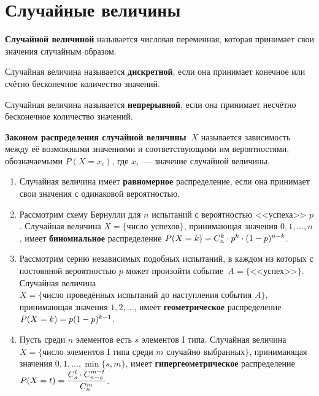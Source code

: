 \section{Случайные величины}
 \textbf{Случайной величиной} называется числовая переменная, которая принимает свои значения случайным образом.

Случайная величина называется \textbf{дискретной}, если она принимает конечное или счётно бесконечное количество значений.

Случайная величина называется \textbf{непрерывной}, если она принимает несчётно бесконечное количество значений.

 \textbf{Законом распределения случайной величины~$X$} называется зависимость между её возможными значениями и соответствующими им вероятностями, обозначаемыми $P(X = x_i)$, где $x_i$~--- значение случайной величины.
\begin{enumerate}
	\item Случайная величина имеет \textbf{равномерное} распределение, если она принимает свои значения с одинаковой вероятностью.
	
	\item Рассмотрим схему Бернулли для $n$ испытаний с вероятностью <<успеха>> $p$.
	Случайная величина $X = \{ \text{число } \allowbreak \text{успехов} \}$, принимающая значения $0, 1, \ldots, n$, имеет \textbf{биномиальное} распределение $P(X = k) = C_n^k \opbr\cdot p^k \opbr\cdot (1 \opbr- p)^{n-k}$.
	
	\item Рассмотрим серию независимых подобных испытаний, в каждом из которых с постоянной вероятностью $p$ может произойти событие~$A = \{ \text{<<успех>>} \}$.
	Случайная величина $X = \{ \text{число проведённых испытаний до } \allowbreak \text{наступления события } A \}$, принимающая значения $1, 2, \ldots$, имеет \textbf{геометрическое} распределение $P(X = k) \opbr= p (1 - p)^{k-1}$.
	
	\item Пусть среди $n$ элементов есть $s$ элементов I типа.
	Случайная величина $X = \{ \text{число элементов I типа среди } m \allowbreak \text{ случайно выбранных} \}$, принимающая значения $0, 1, \ldots, \min \{ s, m \}$, имеет \textbf{гипергеометрическое} распределение $P(X = t) \opbr= \dfrac{C_s^t \cdot C_{n-s}^{m-t}}{C_n^m}$.
\end{enumerate}


